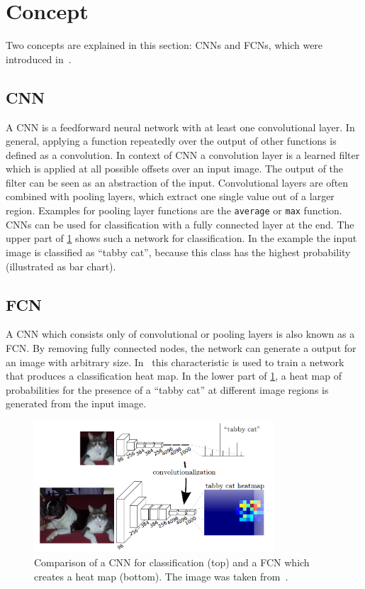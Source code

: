 \section{Concept}\label{sec:concept}
Two concepts are explained in this section: \Glspl{CNN} and \glspl{FCN}, which
were introduced in~\cite{long2014fully}.

\subsection{CNN}
A \gls{CNN} is a feedforward neural network with at least one convolutional
layer. In general, applying a function repeatedly over the output of other
functions is defined as a convolution. In context of \gls{CNN} a convolution
layer is a learned filter which is applied at all possible offsets over an
input image. The output of the filter can be seen as an abstraction of the
input. Convolutional layers are often combined with pooling layers, which
extract one single value out of a larger region. Examples for pooling layer
functions are the \verb+average+ or \verb+max+ function.\\
\gls{CNN}s can be used for classification with a fully connected layer at the
end. The upper part of \cref{fig:fcn} shows such a network
for classification. In the example the input image is classified as
\enquote{tabby cat}, because this class has the highest probability
(illustrated as bar chart).

\subsection{FCN}
A \gls{CNN} which consists only of convolutional or pooling layers is also
known as a \gls{FCN}. By removing fully connected nodes, the network can
generate a output for an image with arbitrary size. In~\cite{long2014fully}
this characteristic is used to train a network that produces a classification
heat map. In the lower part of \cref{fig:fcn}, a heat map of probabilities for
the presence of a \enquote{tabby cat} at different image regions is generated
from the input image.

\begin{figure}[htb]
    \centering
    \includegraphics[width=9cm]{figures/fcnn}
    \caption{Comparison of a \gls{CNN} for classification (top) and a \gls{FCN} which creates a heat map (bottom). The image was taken from~\cite{long2014fully}.}%
\label{fig:fcn}
\end{figure}

